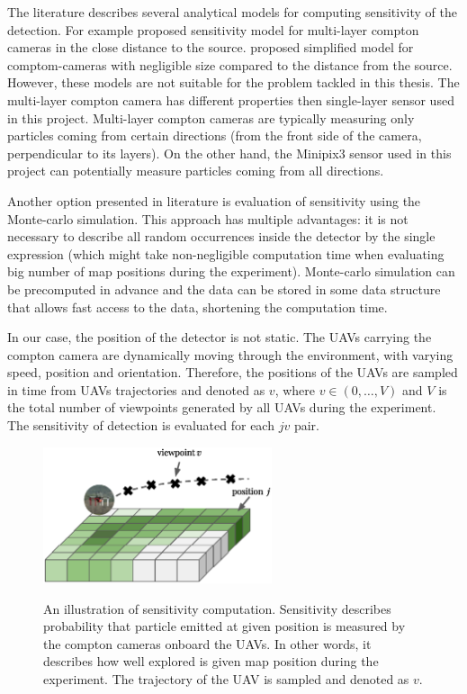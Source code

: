 The literature describes several analytical models for computing sensitivity of the detection. 
For example \cite{wilderman2001} proposed sensitivity model for multi-layer compton cameras in the close distance to the source.
\cite{maxim2016} proposed simplified model for comptom-cameras with negligible size compared to the distance from the source.
However, these models are not suitable for the problem tackled in this thesis.
The multi-layer compton camera has different properties then single-layer sensor used in this project.
Multi-layer compton cameras are typically measuring only particles coming from certain directions (from the front side of the camera, perpendicular to its layers).
On the other hand, the Minipix3 sensor used in this project can potentially measure particles coming from all directions.

Another option presented in literature is evaluation of sensitivity using the Monte-carlo simulation.
This approach has multiple advantages: it is not necessary to describe all random occurrences inside the detector by the single expression (which might take non-negligible computation time when evaluating big number of map positions during the experiment).
Monte-carlo simulation can be precomputed in advance and the data can be stored in some data structure that allows fast access to the data, shortening the computation time.

In our case, the position of the detector is not static. 
The \ac{UAV}s carrying the compton camera are dynamically moving through the environment, with varying speed, position and orientation.
Therefore, the positions of the \ac{UAV}s are sampled in time from \ac{UAV}s trajectories and denoted as $v$, where $v \in (0, \dots , V)$ and $V$ is the total number of viewpoints generated by all \ac{UAV}s during the experiment.
The sensitivity of detection is evaluated for each $jv$ pair.


\begin{figure}[!h]
  \centering
    \includegraphics[width=0.6\textwidth]{./fig/photos/sen.eps}
    \label{fig:sen_illustration}
  \caption{An illustration of sensitivity computation. Sensitivity describes probability that particle emitted at given position is measured by the compton cameras onboard the \ac{UAV}s. In other words, it describes how well explored is given map position during the experiment. The trajectory of the \ac{UAV} is sampled and denoted as $v$.}
\end{figure}



